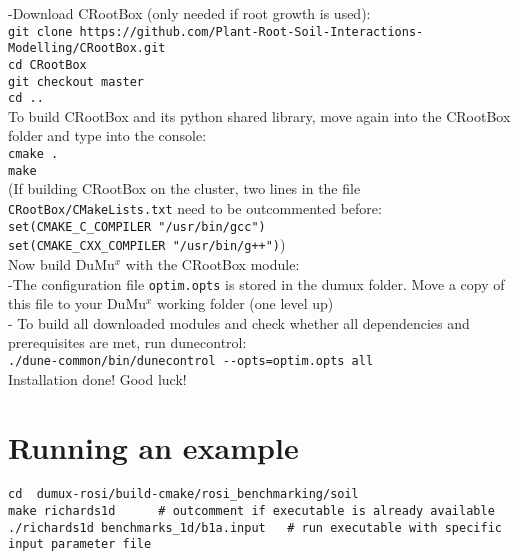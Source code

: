 -Download CRootBox (only needed if root growth is used):\\
\texttt{git clone https://github.com/Plant-Root-Soil-Interactions-Modelling/CRootBox.git}\\
    \hspace{\parindent} \texttt{cd CRootBox}\\
    \hspace{\parindent} \texttt{git checkout master}\\
		\hspace{\parindent} \texttt{cd ..}\\
To build CRootBox and its python shared library, move again into the CRootBox folder and type into the console:\\
\lstinline{cmake .}\\
\lstinline{make}\\
(If building CRootBox on the cluster, two lines in the file \lstinline{CRootBox/CMakeLists.txt} need to be outcommented before:\\ 
\lstinline{set(CMAKE_C_COMPILER "/usr/bin/gcc")}\\
\lstinline{set(CMAKE_CXX_COMPILER "/usr/bin/g++")})\\

Now build DuMu$^{x}$ with the CRootBox module: \\
-The configuration file \lstinline{optim.opts} is stored in the dumux folder. Move a copy of this file to your DuMu$^x$ working folder (one level up)\\

- To build all downloaded modules and check whether all dependencies and prerequisites are met, run dunecontrol:\\
\lstinline{./dune-common/bin/dunecontrol --opts=optim.opts all}\\

Installation done! Good luck!

\section*{Running an example}

\begin{lstlisting}
cd  dumux-rosi/build-cmake/rosi_benchmarking/soil
make richards1d      # outcomment if executable is already available
./richards1d benchmarks_1d/b1a.input   # run executable with specific input parameter file
\end{lstlisting}

